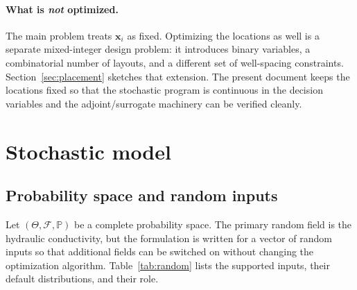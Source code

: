 \documentclass[11pt]{article}
\numberwithin{equation}{section}
\newcommand{\Prob}{\mathbb{P}}
\newcommand{\xx}{\mathbf{x}}
\theoremstyle{plain}
\begin{document}
\paragraph{What is \emph{not} optimized.}
The main problem treats $\xx_i$ as fixed.  Optimizing the locations as well is
a separate mixed-integer design problem: it introduces binary variables, a
combinatorial number of layouts, and a different set of well-spacing
constraints.  Section~\ref{sec:placement} sketches that extension.  The
present document keeps the locations fixed so that the stochastic program is
continuous in the decision variables and the adjoint/surrogate machinery can
be verified cleanly.

\section{Stochastic model}
\label{sec:stochastic}

\subsection{Probability space and random inputs}

Let $(\Theta,\mathcal{F},\Prob)$ be a complete probability space.  The primary
random field is the hydraulic conductivity, but the formulation is written for
a vector of random inputs so that additional fields can be switched on
without changing the optimization algorithm.  Table~\ref{tab:random} lists
the supported inputs, their default distributions, and their role.
\end{document}
